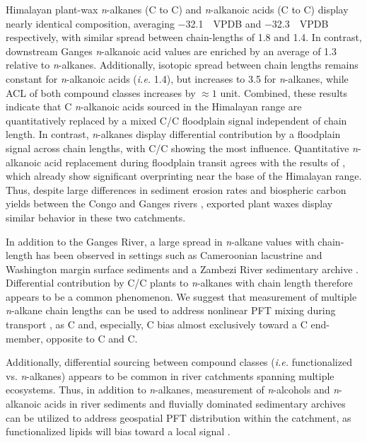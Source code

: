 Himalayan plant-wax \textit{n}-alkanes (C to C) and \textit{n}-alkanoic acids (C to C) display nearly identical  composition, averaging \SI{-32.1}{\permil.VPDB} and \SI{-32.3}{\permil.VPDB} respectively, with similar spread between chain-lengths of \SI{1.8}{\permil} and \SI{1.4}{\permil}. In contrast, downstream Ganges \textit{n}-alkanoic acid  values are enriched by an average of \SI{1.3}{\permil} relative to \textit{n}-alkanes. Additionally, isotopic spread between chain lengths remains constant for \textit{n}-alkanoic acids (\textit{i.e.} \SI{1.4}{\permil}), but increases to \SI{3.5}{\permil} for \textit{n}-alkanes, while ACL of both compound classes increases by $\approx 1$ unit. Combined, these results indicate that C \textit{n}-alkanoic acids sourced in the Himalayan range are quantitatively replaced by a mixed C/C floodplain signal independent of chain length. In contrast, \textit{n}-alkanes display differential contribution by a floodplain signal across chain lengths, with C/C showing the most influence. Quantitative \textit{n}-alkanoic acid replacement during floodplain transit agrees with the results of \citet{Agrawal:2014fl}, which already show significant overprinting near the base of the Himalayan range. Thus, despite large differences in sediment erosion rates and biospheric carbon yields between the Congo and Ganges rivers \citep{Galy:2015fx}, exported plant waxes display similar behavior in these two catchments.

In addition to the Ganges River, a large spread in \textit{n}-alkane  values with chain-length has been observed in settings such as Cameroonian lacustrine and Washington margin surface sediments \citep{Feng:2013iv,Garcin:2014hg} and a Zambezi River sedimentary archive \citep{Wang:2013jz}. Differential contribution by C/C plants to \textit{n}-alkanes with chain length therefore appears to be a common phenomenon. We suggest that  measurement of multiple \textit{n}-alkane chain lengths can be used to address nonlinear PFT mixing during transport \citep{Garcin:2014hg}, as C and, especially, C bias almost exclusively toward a C end-member, opposite to C and C.

Additionally, differential sourcing between compound classes (\textit{i.e.} functionalized vs. \textit{n}-alkanes) appears to be common in river catchments spanning multiple ecosystems. Thus, in addition to \textit{n}-alkanes, measurement of \textit{n}-alcohols and \textit{n}-alkanoic acids in river sediments and fluvially dominated sedimentary archives can be utilized to address geospatial PFT distribution within the catchment, as functionalized lipids will bias toward a local signal \citep[\textit{e.g.}][this study]{Galy:2011ix,Ponton:2014jr}.

